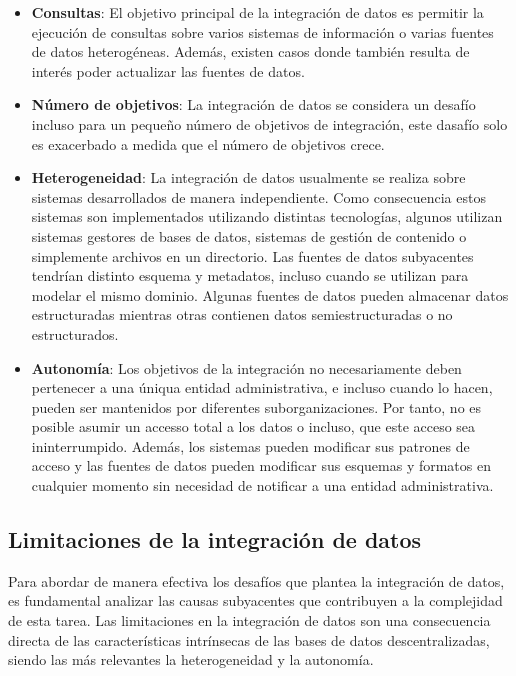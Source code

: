 \begin{itemize}
    \item \textbf{Consultas}: El objetivo principal de la integración de datos es permitir la ejecución de consultas sobre varios
    sistemas de información o varias fuentes de datos heterogéneas. Además, existen casos donde también resulta de interés poder actualizar las fuentes de datos.

    \item \textbf{N\'umero de objetivos}: La integración de datos se considera un desafío incluso para un pequeño número de objetivos de integración,
     este dasafío solo es exacerbado a medida que el número de objetivos crece. 

    \item \textbf{Heterogeneidad}: La integración de datos usualmente se realiza sobre sistemas desarrollados de manera
    independiente. Como consecuencia estos sistemas son implementados utilizando distintas tecnologías, algunos utilizan sistemas gestores
    de bases de datos, sistemas de gestión de contenido o simplemente archivos en un directorio. Las fuentes de datos subyacentes tendrían distinto
    esquema y metadatos, incluso cuando se utilizan para modelar el mismo dominio. Algunas fuentes de datos pueden almacenar datos estructuradas mientras otras contienen datos semiestructuradas o no estructurados.

    \item \textbf{Autonom\'ia}: Los objetivos de la integración no necesariamente deben pertenecer a una úniqua entidad administrativa,
    e incluso cuando lo hacen, pueden ser mantenidos por diferentes suborganizaciones. Por tanto, no es posible asumir un accesso total
    a los datos o incluso, que este acceso sea ininterrumpido. Además, los sistemas pueden modificar sus patrones de acceso y las fuentes de datos pueden modificar sus esquemas y
    formatos en cualquier momento sin necesidad de notificar a una entidad administrativa.
\end{itemize}

\subsection{Limitaciones de la integración de datos}

    Para abordar de manera efectiva los desafíos que plantea la integración de datos, es fundamental analizar las causas subyacentes que contribuyen a la complejidad de esta tarea. Las limitaciones en la integración de datos son una consecuencia directa de las características intrínsecas de las bases de datos descentralizadas, siendo las más relevantes la heterogeneidad y la autonomía.




